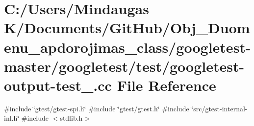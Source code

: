 \hypertarget{googletest-master_2googletest_2test_2googletest-output-test___8cc}{}\section{C\+:/\+Users/\+Mindaugas K/\+Documents/\+Git\+Hub/\+Obj\+\_\+\+Duomenu\+\_\+apdorojimas\+\_\+class/googletest-\/master/googletest/test/googletest-\/output-\/test\+\_\+.cc File Reference}
\label{googletest-master_2googletest_2test_2googletest-output-test___8cc}
{\ttfamily \#include \char`\"{}gtest/gtest-\/spi.\+h\char`\"{}}\newline
{\ttfamily \#include \char`\"{}gtest/gtest.\+h\char`\"{}}\newline
{\ttfamily \#include \char`\"{}src/gtest-\/internal-\/inl.\+h\char`\"{}}\newline
{\ttfamily \#include $<$stdlib.\+h$>$}\newline
